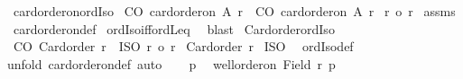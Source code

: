 \begin{isabellebody}
\endisatagproof
{\isafoldproof}%
%
\isadelimproof
\isanewline
%
\endisadelimproof
\isanewline
{}\isamarkupfalse%
\ card{\isacharunderscore}{\kern0pt}order{\isacharunderscore}{\kern0pt}on{\isacharunderscore}{\kern0pt}ordIso{\isacharcolon}{\kern0pt}\isanewline
{}\ CO{\isacharcolon}{\kern0pt}\ {\isachardoublequoteopen}card{\isacharunderscore}{\kern0pt}order{\isacharunderscore}{\kern0pt}on\ A\ r{\isachardoublequoteclose}\ \ CO{\isacharprime}{\kern0pt}{\isacharcolon}{\kern0pt}\ {\isachardoublequoteopen}card{\isacharunderscore}{\kern0pt}order{\isacharunderscore}{\kern0pt}on\ A\ r{\isacharprime}{\kern0pt}{\isachardoublequoteclose}\isanewline
{}\ {\isachardoublequoteopen}r\ {\isacharequal}{\kern0pt}o\ r{\isacharprime}{\kern0pt}{\isachardoublequoteclose}\isanewline
%
\isadelimproof
%
\endisadelimproof
%
\isatagproof
{}\isamarkupfalse%
\ assms\ \isamarkupfalse%
\ card{\isacharunderscore}{\kern0pt}order{\isacharunderscore}{\kern0pt}on{\isacharunderscore}{\kern0pt}def\isanewline
{}\isamarkupfalse%
\ ordIso{\isacharunderscore}{\kern0pt}iff{\isacharunderscore}{\kern0pt}ordLeq\ \isamarkupfalse%
\ blast%
\endisatagproof
{\isafoldproof}%
%
\isadelimproof
\isanewline
%
\endisadelimproof
\isanewline
{}\isamarkupfalse%
\ Card{\isacharunderscore}{\kern0pt}order{\isacharunderscore}{\kern0pt}ordIso{\isacharcolon}{\kern0pt}\isanewline
{}\ CO{\isacharcolon}{\kern0pt}\ {\isachardoublequoteopen}Card{\isacharunderscore}{\kern0pt}order\ r{\isachardoublequoteclose}\ \ ISO{\isacharcolon}{\kern0pt}\ {\isachardoublequoteopen}r{\isacharprime}{\kern0pt}\ {\isacharequal}{\kern0pt}o\ r{\isachardoublequoteclose}\isanewline
{}\ {\isachardoublequoteopen}Card{\isacharunderscore}{\kern0pt}order\ r{\isacharprime}{\kern0pt}{\isachardoublequoteclose}\isanewline
%
\isadelimproof
%
\endisadelimproof
%
\isatagproof
{}\isamarkupfalse%
\ ISO\ \isamarkupfalse%
\ ordIso{\isacharunderscore}{\kern0pt}def\isanewline
{}\isamarkupfalse%
{\isacharparenleft}{\kern0pt}unfold\ card{\isacharunderscore}{\kern0pt}order{\isacharunderscore}{\kern0pt}on{\isacharunderscore}{\kern0pt}def{\isacharcomma}{\kern0pt}\ auto{\isacharparenright}{\kern0pt}\isanewline
\ \ \isamarkupfalse%
\ p{\isacharprime}{\kern0pt}\ \isamarkupfalse%
\ {\isachardoublequoteopen}well{\isacharunderscore}{\kern0pt}order{\isacharunderscore}{\kern0pt}on\ {\isacharparenleft}{\kern0pt}Field\ r{\isacharprime}{\kern0pt}{\isacharparenright}{\kern0pt}\ p{\isacharprime}{\kern0pt}{\isachardoublequoteclose}\isanewline

\end{isabellebody}
